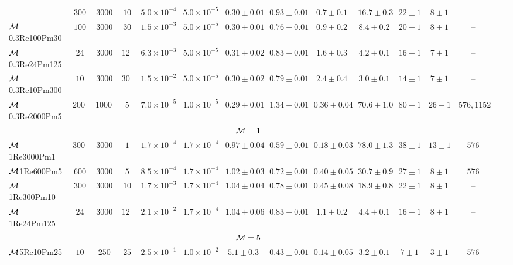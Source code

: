 \begin{table}
{{\begin{threeparttable}
\begin{tabular}{l c c c c c c c c c c c c c c}
	& $300$ & $3000$ & $10$
	& $5.0 \times 10^{-4}$ & $5.0 \times 10^{-5}$ & $0.30 \pm 0.01$
	& $0.93 \pm 0.01$ & $0.7 \pm 0.1$
	& $16.7 \pm 0.3$ & $22 \pm 1$ & $8 \pm 1$
	& -- \\
$\mathcal{M}$0.3Re100Pm30
	& $100$ & $3000$ & $30$
	& $1.5 \times 10^{-3}$ & $5.0 \times 10^{-5}$ & $0.30 \pm 0.01$
	& $0.76 \pm 0.01$ & $0.9 \pm 0.2$
	& $8.4 \pm 0.2$ & $20 \pm 1$ & $8 \pm 1$
	& -- \\
$\mathcal{M}$0.3Re24Pm125
	& $24$ & $3000$ & $125$
	& $6.3 \times 10^{-3}$ & $5.0 \times 10^{-5}$ & $0.31 \pm 0.02$
	& $0.83 \pm 0.01$ & $1.6 \pm 0.3$
	& $4.2 \pm 0.1$ & $16 \pm 1$ & $7 \pm 1$
	& -- \\
$\mathcal{M}$0.3Re10Pm300
	& $10$ & $3000$ & $300$
	& $1.5 \times 10^{-2}$ & $5.0 \times 10^{-5}$ & $0.30 \pm 0.02$
	& $0.79 \pm 0.01$ & $2.4 \pm 0.4$
	& $3.0 \pm 0.1$ & $14 \pm 1$ & $7 \pm 1$
	& -- \\
$\mathcal{M}$0.3Re2000Pm5
	& $2000$ & $10000$ & $5$
	& $7.0 \times 10^{-5}$ & $1.0 \times 10^{-5}$ & $0.29 \pm 0.01$
	& $1.34 \pm 0.01$ & $0.36 \pm 0.04$
	& $70.6 \pm 1.0$ & $80 \pm 1$ & $26 \pm 1$
	& $576, 1152$ \\
\hline
\multicolumn{13}{c}{$\mathcal{M} = 1$} \\
\hline
$\mathcal{M}$1Re3000Pm1
	& $3000$ & $3000$ & $1$
	& $1.7 \times 10^{-4}$ & $1.7 \times 10^{-4}$ & $0.97 \pm 0.04$
	& $0.59 \pm 0.01$ & $0.18 \pm 0.03$
	& $78.0 \pm 1.3$ & $38 \pm 1$ & $13 \pm 1$
	& $576$ \\
$\mathcal{M}$1Re600Pm5
	& $600$ & $3000$ & $5$
	& $8.5 \times 10^{-4}$ & $1.7 \times 10^{-4}$ & $1.02 \pm 0.03$
	& $0.72 \pm 0.01$ & $0.40 \pm 0.05$
	& $30.7 \pm 0.9$ & $27 \pm 1$ & $8 \pm 1$
	& $576$ \\
$\mathcal{M}$1Re300Pm10
	& $300$ & $3000$ & $10$
	& $1.7 \times 10^{-3}$ & $1.7 \times 10^{-4}$ & $1.04 \pm 0.04$
	& $0.78 \pm 0.01$ & $0.45 \pm 0.08$
	& $18.9 \pm 0.8$ & $22 \pm 1$ & $8 \pm 1$
	& -- \\
$\mathcal{M}$1Re24Pm125
	& $24$ & $3000$ & $125$
	& $2.1 \times 10^{-2}$ & $1.7 \times 10^{-4}$ & $1.04 \pm 0.06$
	& $0.83 \pm 0.01$ & $1.1 \pm 0.2$
	& $4.4 \pm 0.1$ & $16 \pm 1$ & $8 \pm 1$
	& -- \\
\hline
\multicolumn{13}{c}{$\mathcal{M} = 5$} \\
\hline
$\mathcal{M}$5Re10Pm25
	& $10$ & $250$ & $25$
	& $2.5 \times 10^{-1}$ & $1.0 \times 10^{-2}$ & $5.1 \pm 0.3$
	& $0.43 \pm 0.01$ & $0.14 \pm 0.05$
	& $3.2 \pm 0.1$ & $7 \pm 1$ & $3 \pm 1$
	& $576$ \\

\end{tabular}
\end{threeparttable}}}
\end{table}

